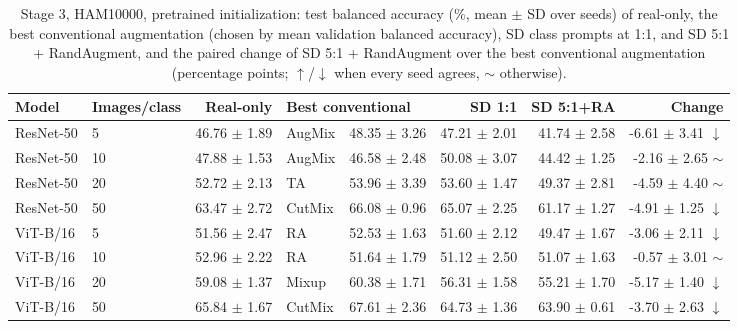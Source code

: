 \begin{table}[H]
\centering
\small
\setlength{\tabcolsep}{4pt}
\caption{Stage 3, HAM10000, pretrained initialization: test balanced accuracy (\%, mean $\pm$ SD over seeds) of real-only, the best conventional augmentation (chosen by mean validation balanced accuracy), SD class prompts at 1:1, and SD 5:1 + RandAugment, and the paired change of SD 5:1 + RandAugment over the best conventional augmentation (percentage points; $\uparrow$/$\downarrow$ when every seed agrees, $\sim$ otherwise).}
\label{tab:stage3-ham10000-scores-pretrained-test}
\begin{tabular}{llrlrrrr}
\toprule
Model & Images/class & Real-only & \multicolumn{2}{l}{Best conventional} & SD 1:1 & SD 5:1+RA & Change \\
\midrule
ResNet-50 & 5 & 46.76 $\pm$ 1.89 & AugMix & 48.35 $\pm$ 3.26 & 47.21 $\pm$ 2.01 & 41.74 $\pm$ 2.58 & -6.61 $\pm$ 3.41 $\downarrow$ \\
ResNet-50 & 10 & 47.88 $\pm$ 1.53 & AugMix & 46.58 $\pm$ 2.48 & 50.08 $\pm$ 3.07 & 44.42 $\pm$ 1.25 & -2.16 $\pm$ 2.65 $\sim$ \\
ResNet-50 & 20 & 52.72 $\pm$ 2.13 & TA & 53.96 $\pm$ 3.39 & 53.60 $\pm$ 1.47 & 49.37 $\pm$ 2.81 & -4.59 $\pm$ 4.40 $\sim$ \\
ResNet-50 & 50 & 63.47 $\pm$ 2.72 & CutMix & 66.08 $\pm$ 0.96 & 65.07 $\pm$ 2.25 & 61.17 $\pm$ 1.27 & -4.91 $\pm$ 1.25 $\downarrow$ \\
ViT-B/16 & 5 & 51.56 $\pm$ 2.47 & RA & 52.53 $\pm$ 1.63 & 51.60 $\pm$ 2.12 & 49.47 $\pm$ 1.67 & -3.06 $\pm$ 2.11 $\downarrow$ \\
ViT-B/16 & 10 & 52.96 $\pm$ 2.22 & RA & 51.64 $\pm$ 1.79 & 51.12 $\pm$ 2.50 & 51.07 $\pm$ 1.63 & -0.57 $\pm$ 3.01 $\sim$ \\
ViT-B/16 & 20 & 59.08 $\pm$ 1.37 & Mixup & 60.38 $\pm$ 1.71 & 56.31 $\pm$ 1.58 & 55.21 $\pm$ 1.70 & -5.17 $\pm$ 1.40 $\downarrow$ \\
ViT-B/16 & 50 & 65.84 $\pm$ 1.67 & CutMix & 67.61 $\pm$ 2.36 & 64.73 $\pm$ 1.36 & 63.90 $\pm$ 0.61 & -3.70 $\pm$ 2.63 $\downarrow$ \\
\bottomrule
\end{tabular}
\end{table}

